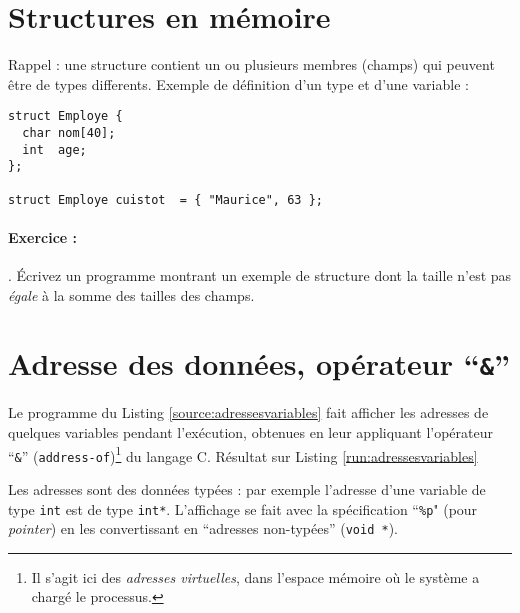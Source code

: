 \section{Structures en mémoire}

Rappel : une structure contient un ou plusieurs membres (champs)
qui peuvent être de types differents. Exemple de définition d'un type et d'une variable :

\begin{lstlisting}[style=cextract]
struct Employe {
  char nom[40];
  int  age;
};

struct Employe cuistot  = { "Maurice", 63 };
\end{lstlisting}

\paragraph{Exercice :}  \label{exo:taillestructure} . Écrivez un
programme montrant un exemple de structure dont la taille n'est pas 
\emph{égale} à la somme des tailles des champs.

\section{Adresse des données, opérateur ``\texttt{\&}''}

Le programme du Listing \ref{source:adressesvariables} fait afficher
les adresses de quelques variables pendant l'exécution, obtenues en
leur appliquant l'opérateur ``\texttt{\&}''
(\texttt{address-of})\footnote{Il s'agit ici des \emph{adresses
    virtuelles}, dans l'espace mémoire où le système a chargé le
  processus.} du langage C. Résultat sur Listing \ref{run:adressesvariables}









Les adresses sont des données typées : par exemple l'adresse d'une
variable de type \texttt{int} est de type \texttt{int*}.
L'affichage se fait avec la spécification ``\texttt{\%p}" (pour
\emph{pointer})
en les convertissant en ``adresses non-typées'' (\texttt{void *}).
  
